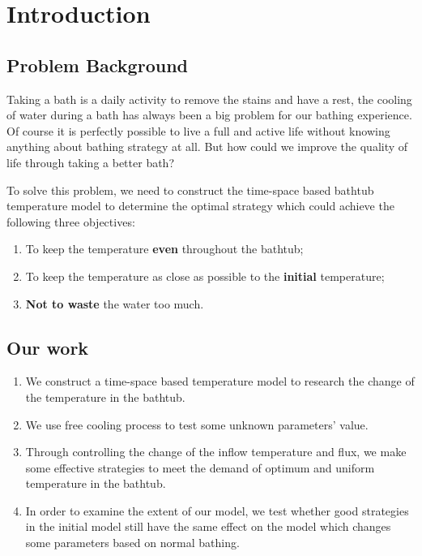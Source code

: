 \documentclass{HZNUMCM}
\begin{document}
\showSummarySheet
\showContents

\section{Introduction}
\subsection{Problem Background}
Taking a bath is a daily activity to remove the stains and have a rest, the cooling of water during 
a bath has always been a big problem for our bathing experience. Of course it is perfectly possible
to live a full and active life without knowing anything about bathing strategy at all. But how could
we improve the quality of life through taking a better bath?

To solve this problem,  we need to construct the time-space based bathtub temperature model to
determine the optimal strategy which could achieve the following three objectives:
\begin{enumerate}[\quad\bf1.]
    \item To keep the temperature \textbf{even} throughout the bathtub;
    \item To keep the temperature as close as possible to the \textbf{initial} temperature;
    \item \textbf{Not to waste} the water too much.
\end{enumerate}

\subsection{Our work}
\begin{enumerate}[\bf 1.]
    \item We construct a time-space based temperature model to research the change of the
    temperature in the bathtub.
    \item We use free cooling process to test some unknown parameters' value.
    \item Through controlling the change of the inflow temperature and flux, we make some effective
    strategies to meet the demand of optimum and uniform temperature in the bathtub.
    \item In order to examine the extent of our model, we test whether good strategies in the
    initial model still have the same effect on the model which changes some parameters based on
    normal bathing.
\end{enumerate}
\end{document}
